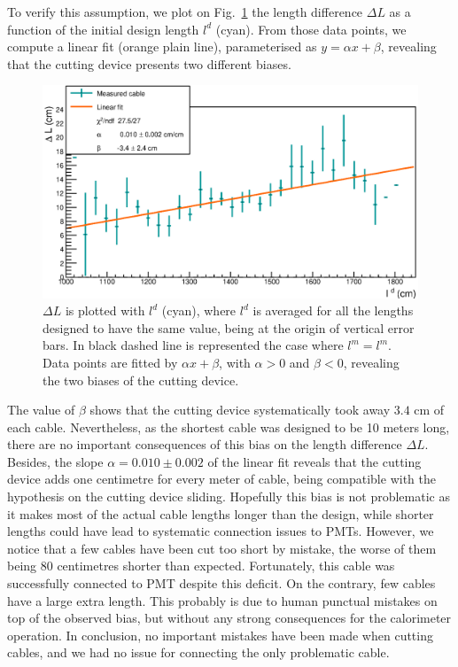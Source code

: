 To verify this assumption, we plot on Fig.~\ref{fig:CutBias} the length difference $\Delta L$ as a function of the initial design length $l^{d}$ (cyan).
From those data points, we compute a linear fit (orange plain line), parameterised as $y = \alpha x + \beta$, revealing that the cutting device presents two different biases.
\begin{figure}
  \centering
  \includegraphics[width=15cm]{commissioning/fig_commissioning/cut_biais.eps}

  \caption{$\Delta L$ is plotted with $l^{d}$ (cyan), where $l^{d}$ is averaged for all the lengths designed to have the same value, being at the origin of vertical error bars.
    In black dashed line is represented the case where $l^{m} = l^{m}$.
    Data points are fitted by $\alpha x + \beta$, with $\alpha > 0$ and $\beta < 0$, revealing the two biases of the cutting device.
    \label{fig:CutBias}}
\end{figure}
The value of $\beta$ shows that the cutting device systematically took away $3.4$ cm of each cable.
Nevertheless, as the shortest cable was designed to be 10 meters long, there are no important consequences of this bias on the length difference $\Delta L$.
Besides, the slope $\alpha = 0.010\pm 0.002$ of the linear fit reveals that the cutting device adds one centimetre for every meter of cable, being compatible with the hypothesis on the cutting device sliding.
Hopefully this bias is not problematic as it makes most of the actual cable lengths longer than the design, while shorter lengths could have lead to systematic connection issues to PMTs.
However, we notice that a few cables have been cut too short by mistake, the worse of them being $80$ centimetres shorter than expected.
Fortunately, this cable  was successfully connected to PMT despite this deficit.
On the contrary, few cables have a large extra length.
This probably is due to human punctual mistakes on top of the observed bias, but without any strong consequences for the calorimeter operation.
In conclusion, no important mistakes have been made when cutting cables, and we had no issue for connecting the only problematic cable.

